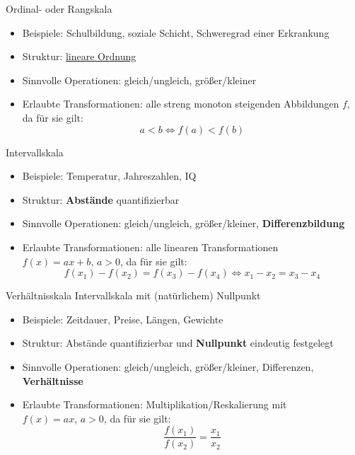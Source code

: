 \documentclass[
  10pt,
  ignorenonframetext,
]{beamer}
\providecommand{\tightlist}{%
  \setlength{\itemsep}{0pt}\setlength{\parskip}{0pt}}
\begin{document}
\begin{frame}{Ordinal- oder Rangskala}
\label{ordinal--oder-rangskala}
\begin{itemize}
\tightlist
\item
  Beispiele: Schulbildung, soziale Schicht, Schweregrad einer Erkrankung
\item
  Struktur:
  \href{https://de.wikipedia.org/wiki/Ordnungsrelation\#Totalordnung}{lineare
  Ordnung}
\item
  Sinnvolle Operationen: gleich/ungleich, größer/kleiner
\item
  Erlaubte Transformationen: alle streng monoton steigenden Abbildungen
  \(f\), da für sie gilt: \begin{equation*}
               a<b \iff f(a) < f(b)
           \end{equation*}
\end{itemize}
\end{frame}

\begin{frame}{Intervallskala}
\label{intervallskala}
\begin{itemize}
\tightlist
\item
  Beispiele: Temperatur, Jahreszahlen, IQ
\item
  Struktur: \textbf{Abstände} quantifizierbar
\item
  Sinnvolle Operationen: gleich/ungleich, größer/kleiner,
  \textbf{Differenzbildung}
\item
  Erlaubte Transformationen: alle linearen Transformationen
  \(f(x) = ax+b,\, a > 0\), da für sie gilt: \begin{equation*}
               f(x_1) - f(x_2) = f(x_3) - f(x_4) \iff x_1 - x_2 = x_3 - x_4
           \end{equation*}
\end{itemize}
\end{frame}

\begin{frame}{Verhältnisskala}
\label{verhuxe4ltnisskala}
Intervallskala mit (natürlichem) Nullpunkt

\begin{itemize}
\tightlist
\item
  Beispiele: Zeitdauer, Preise, Längen, Gewichte
\item
  Struktur: Abstände quantifizierbar und \textbf{Nullpunkt} eindeutig
  festgelegt
\item
  Sinnvolle Operationen: gleich/ungleich, größer/kleiner, Differenzen,
  \textbf{Verhältnisse}
\item
  Erlaubte Transformationen: Multiplikation/Reskalierung mit
  \(f(x) = ax,\, a > 0\), da für sie gilt: \begin{equation*}
               \frac{f(x_1)}{f(x_2)} = \frac{x_1}{x_2}
           \end{equation*}
\end{itemize}
\end{frame}
\end{document}
